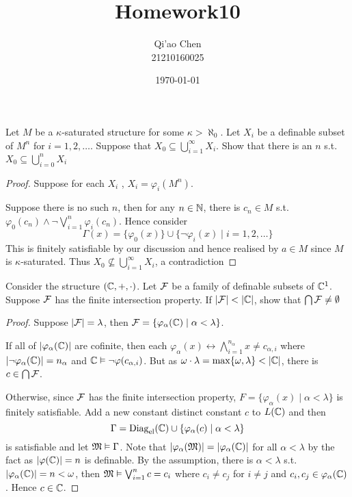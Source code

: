 \documentclass[11pt]{article}
\author{Qi'ao Chen\\21210160025}
\date{\today}
\title{Homework10}
\begin{document}
\maketitle
\begin{exercise}
Let \(M\) be a \(\kappa\)-saturated structure for some \(\kappa>\aleph_0\). Let \(X_i\)  be a definable subset of \(M^n\)
for \(i=1,2,\dots\). Suppose that \(X_0\subseteq\bigcup_{i=1}^\infty X_i\). Show that there is an \(n\) s.t. \(X_0\subseteq\bigcup_{i=0}^nX_i\)
\end{exercise}

\begin{proof}
Suppose for each \(X_i\) , \(X_i=\varphi_i(M^n)\).

Suppose there is no such \(n\), then for any \(n\in\mathbb{N}\), there is \(c_n\in M\)
s.t. \(\varphi_0(c_n)\wedge\neg\bigvee_{i=1}^n\varphi_i(c_n)\). Hence consider
\begin{equation*}
\Gamma(x)=\{\varphi_0(x)\}\cup\{\neg\varphi_i(x)\mid i=1,2,\dots\}
\end{equation*}
This is finitely satisfiable by our discussion and hence realised by \(a\in M\) since \(M\) is
\(\kappa\)-saturated. Thus \(X_0\not\subseteq\bigcup_{i=1}^\infty X_i\), a contradiction
\end{proof}

\begin{exercise}
Consider the structure \((\mathbb{C},+,\cdot)\). Let \(\mathcal{F}\) be a family of definable subsets of \(\mathbb{C}^1\).
Suppose \(\mathcal{F}\) has the finite intersection property. If \(\abs{\calf}<\abs{\C}\), show that \(\bigcap\mathcal{F}\neq\emptyset\)
\end{exercise}

\begin{proof}
Suppose \(\abs{\calf}=\lambda\), then \(\mathcal{F}=\{\varphi_\alpha(\mathbb{C})\mid\alpha<\lambda\}\).

If all of \(\abs{\varphi_\alpha(\C)}\) are cofinite, then each \(\varphi_\alpha(x)\leftrightarrow\bigwedge_{i=1}^{n_\alpha}x\neq c_{\alpha,i}\)
where \(\abs{\neg\varphi_\alpha(\C)}=n_\alpha\) and \(\mathbb{C}\vDash\neg\varphi(c_{\alpha,i})\). But as \(\omega\cdot\lambda=\max\{\omega,\lambda\}<\abs{\C}\), there is \(c\in\bigcap\mathcal{F}\).

Otherwise, since \(\mathcal{F}\) has the finite intersection property,
\(F=\{\varphi_\alpha(x)\mid\alpha<\lambda\}\) is finitely satisfiable. Add a new constant distinct constant \(c\)
to \(L(\mathbb{C})\) and then
\begin{equation*}
\Gamma=\operatorname{Diag}_{\operatorname{el}}(\mathbb{C})\cup\{\varphi_\alpha(c)\mid\alpha<\lambda\}
\end{equation*}
is satisfiable and let \(\mathfrak{M}\vDash\Gamma\). Note that \(\abs{\varphi_\alpha(\fM)}=\abs{\varphi_\alpha(\C)}\) for all \(\alpha<\lambda\) by the fact
as \(\abs{\varphi(\C)}=n\) is definable. By the assumption, there is \(\alpha<\lambda\) s.t. \(\abs{\varphi_\alpha(\C)}=n<\omega\), then \(\mathfrak{M}\vDash\bigvee_{i=1}^nc=c_i\)
where \(c_i\neq c_j\) for \(i\neq j\) and \(c_i,c_j\in\varphi_\alpha(\mathbb{C})\). Hence \(c\in\mathbb{C}\).
\end{proof}
\end{document}
